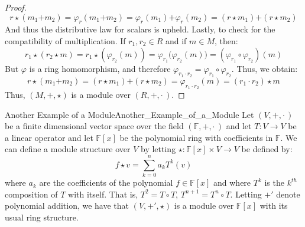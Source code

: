 \begin{proof}
\begin{equation}
            r\star(m_{1}\boldsymbol{+}m_{2})
            =\varphi_{r}(m_{1}\boldsymbol{+}m_{2})
            =\varphi_{r}(m_{1})\boldsymbol{+}\varphi_{r}(m_{2})
            =(r\star{m}_{1})\boldsymbol{+}(r\star{m}_{2})
        \end{equation}
        And thus the distributive law for scalars is upheld. Lastly, to check
        for the compatibility of multiplication. If $r_{1},r_{2}\in{R}$ and if
        $m\in{M}$, then:
        \begin{equation}
            r_{1}\star(r_{2}\star{m})
            =r_{1}\star(\varphi_{r_{2}}(m))
            =\varphi_{r_{1}}\big(\varphi_{r_{2}}(m)\big)
            =(\varphi_{r_{1}}\circ\varphi_{r_{2}})(m)
        \end{equation}
        But $\varphi$ is a ring homomorphism, and therefore
        $\varphi_{r_{1}\cdot{r_{2}}}=\varphi_{r_{1}}\circ\varphi_{r_{2}}$.
        Thus, we obtain:
        \begin{equation}
            r\star(m_{1}\boldsymbol{+}m_{2})
            =(r\star{m}_{1})\boldsymbol{+}(r\star{m}_{2})
            =\varphi_{r_{1}\cdot{r_{2}}}(m)
            =(r_{1}\cdot{r}_{2})\star{m}
        \end{equation}
        Thus, $(M,\boldsymbol{+},\star)$ is a module over $(R,+,\cdot\,)$.
    \end{proof}
    \begin{lexample}{Another Example of a Module}{Another_Example_of_a_Module}
        Let $(V,\boldsymbol{+},\boldsymbol{\cdot}\,)$ be a finite dimensional
        vector space over the field $(\mathbb{F},+,\cdot\,)$ and let
        $T:V\rightarrow{V}$ be a linear operator and let $\mathbb{F}[x]$ be the
        polynomial ring with coefficients in $\mathbb{F}$. We can define a
        module structure over $V$ by letting
        $\star:\mathbb{F}[x]\times{V}\rightarrow{V}$ be defined by:
        \begin{equation}
            f\star{v}=\sum_{k=0}^{n}a_{k}T^{k}(v)
        \end{equation}
        where $a_{k}$ are the coefficients of the polynomial $f\in\mathbb{F}[x]$
        and where $T^{k}$ is the $k^{th}$ composition of $T$ with itself. That
        is, $T^{2}=T\circ{T}$, $T^{n+1}=T^{n}\circ{T}$. Letting
        $\boldsymbol{+}'$ denote polynomial addition, we have that
        $(V,\boldsymbol{+}',\star)$ is a module over $\mathbb{F}[x]$ with its
        usual ring structure.
    \end{lexample}
